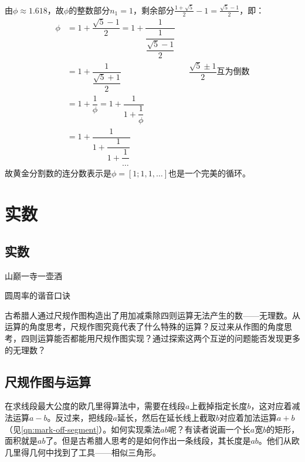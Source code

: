 \documentclass[b5paper]{ctexart}
\begin{document}
\begin{Answer}[ref={ex:irrationals}]
{\vspace{2mm}

由$\phi \approx 1.618$，故$\phi$的整数部分$n_1 = 1$，剩余部分$\frac{1 + \sqrt{5}}{2} - 1 = \frac{\sqrt{5} - 1}{2}$，即：
\begin{align*}
  \phi &= 1 + \dfrac{\sqrt{5} - 1}{2} = 1 + \dfrac{1}{\dfrac{1}{\dfrac{\sqrt{5} - 1}{2}}}  \\
  &= 1 + \dfrac{1}{\dfrac{\sqrt{5} + 1}{2}} && \dfrac{\sqrt{5} \pm 1}{2} \text{互为倒数} \\
  &= 1 + \dfrac{1}{\phi} = 1 + \dfrac{1}{1 + \dfrac{1}{\phi}} \\
  &= 1 + \dfrac{1}{1 + \dfrac{1}{1 + \dfrac{1}{\dotso}}}
\end{align*}
故黄金分割数的连分数表示是$\phi = [1; 1, 1, \dotso]$也是一个完美的循环。
}

\end{Answer}

\ifx\wholebook\relax
\chapter{实数}
\else
\section{实数}
\fi

\epigraph{山巅一寺一壶酒}{圆周率的谐音口诀}

古希腊人通过尺规作图构造出了用加减乘除四则运算无法产生的数——无理数。从运算的角度思考，尺规作图究竟代表了什么特殊的运算？反过来从作图的角度思考，四则运算能否都能用尺规作图实现？通过探索这两个互逆的问题能否发现更多的无理数？

\section{尺规作图与运算}
\label{sec:geometric-arthimetic} 
在求线段最大公度的欧几里得算法中，需要在线段$a$上截掉指定长度$b$，这对应着减法运算$a - b$。反过来，把线段$a$延长，然后在延长线上截取$b$对应着加法运算$a + b$（见\cref{qn:mark-off-segment}）。如何实现乘法$ab$呢？有读者说画一个长$a$宽$b$的矩形，面积就是$ab$了。但是古希腊人思考的是如何作出一条线段，其长度是$ab$。他们从欧几里得几何中找到了工具——相似三角形。
\end{document}
